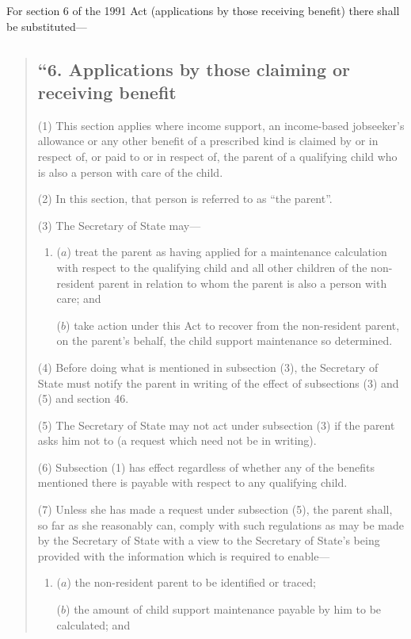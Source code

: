 \documentclass[12pt,a4paper]{article}
\begin{document}
For section 6 of the 1991 Act (applications by those receiving benefit) there shall be substituted—
\begin{quotation}
\subsection*{“6. Applications by those claiming or receiving benefit}

(1) This section applies where income support, an income-based jobseeker’s allowance or any other benefit of a prescribed kind is claimed by or in respect of, or paid to or in respect of, the parent of a qualifying child who is also a person with care of the child.

(2) In this section, that person is referred to as “the parent”.

(3) The Secretary of State may—
\begin{enumerate}\item[]
($a$) treat the parent as having applied for a maintenance calculation with respect to the qualifying child and all other children of the non-resident parent in relation to whom the parent is also a person with care; and

($b$) take action under this Act to recover from the non-resident parent, on the parent’s behalf, the child support maintenance so determined.
\end{enumerate}

(4) Before doing what is mentioned in subsection (3), the Secretary of State must notify the parent in writing of the effect of subsections (3)  and (5)  and section 46. 

(5) The Secretary of State may not act under subsection (3)  if the parent asks him not to (a request which need not be in writing).

(6) Subsection (1)  has effect regardless of whether any of the benefits mentioned there is payable with respect to any qualifying child.

(7) Unless she has made a request under subsection (5), the parent shall, so far as she reasonably can, comply with such regulations as may be made by the Secretary of State with a view to the Secretary of State’s being provided with the information which is required to enable—
\begin{enumerate}\item[]
($a$) the non-resident parent to be identified or traced;

($b$) the amount of child support maintenance payable by him to be calculated; and


\end{enumerate}
\end{quotation}
\end{document}
